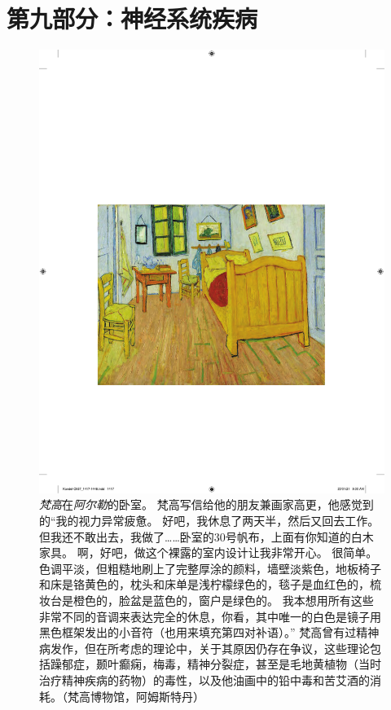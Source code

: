 \chapter*{第九部分：神经系统疾病}

\begin{figure}[htbp]
	\centering
	\includegraphics[width=1.0\linewidth]{chap57/fig_57_0}
	\caption{\textit{梵高}在\textit{阿尔勒}的卧室。
		梵高写信给他的朋友兼画家高更，他感觉到的“我的视力异常疲惫。
		好吧，我休息了两天半，然后又回去工作。
		但我还不敢出去，我做了……卧室的30号帆布，上面有你知道的白木家具。
		啊，好吧，做这个裸露的室内设计让我非常开心。
		很简单。
		色调平淡，但粗糙地刷上了完整厚涂的颜料，墙壁淡紫色，地板椅子和床是铬黄色的，枕头和床单是浅柠檬绿色的，毯子是血红色的，梳妆台是橙色的，脸盆是蓝色的，窗户是绿色的。
		我本想用所有这些非常不同的音调来表达完全的休息，你看，其中唯一的白色是镜子用黑色框架发出的小音符（也用来填充第四对补语）。”
		梵高曾有过精神病发作，但在所考虑的理论中，关于其原因仍存在争议，这些理论包括躁郁症，颞叶癫痫，梅毒，精神分裂症，甚至是毛地黄植物（当时治疗精神疾病的药物）的毒性，以及他油画中的铅中毒和苦艾酒的消耗。（梵高博物馆，阿姆斯特丹）}
	\label{fig:59_0}
\end{figure}


